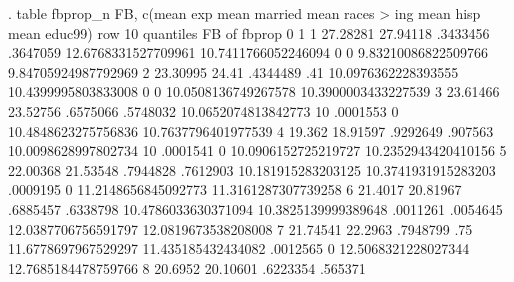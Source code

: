 . table fbprop_n FB, c(mean exp mean married mean races
> ing mean hisp mean educ99) row
{\smallskip}
10        {\VBAR}
quantiles {\VBAR}                    FB                   
of fbprop {\VBAR}                   0                    1
        1 {\VBAR}            27.28281             27.94118
          {\VBAR}            .3433456             .3647059
          {\VBAR} 12.6768331527709961  10.7411766052246094
          {\VBAR}                   0                    0
          {\VBAR} 9.83210086822509766  9.84705924987792969
          {\VBAR} 
        2 {\VBAR}            23.30995                24.41
          {\VBAR}            .4344489                  .41
          {\VBAR} 10.0976362228393555  10.4399995803833008
          {\VBAR}                   0                    0
          {\VBAR} 10.0508136749267578  10.3900003433227539
          {\VBAR} 
        3 {\VBAR}            23.61466             23.52756
          {\VBAR}            .6575066             .5748032
          {\VBAR} 10.0652074813842773                   10
          {\VBAR}            .0001553                    0
          {\VBAR} 10.4848623275756836  10.7637796401977539
          {\VBAR} 
        4 {\VBAR}              19.362             18.91597
          {\VBAR}            .9292649              .907563
          {\VBAR} 10.0098628997802734                   10
          {\VBAR}            .0001541                    0
          {\VBAR} 10.0906152725219727  10.2352943420410156
          {\VBAR} 
        5 {\VBAR}            22.00368             21.53548
          {\VBAR}            .7944828             .7612903
          {\VBAR}  10.181915283203125  10.3741931915283203
          {\VBAR}            .0009195                    0
          {\VBAR} 11.2148656845092773  11.3161287307739258
          {\VBAR} 
        6 {\VBAR}             21.4017             20.81967
          {\VBAR}            .6885457             .6338798
          {\VBAR} 10.4786033630371094  10.3825139999389648
          {\VBAR}            .0011261             .0054645
          {\VBAR} 12.0387706756591797  12.0819673538208008
          {\VBAR} 
        7 {\VBAR}            21.74541              22.2963
          {\VBAR}            .7948799                  .75
          {\VBAR} 11.6778697967529297   11.435185432434082
          {\VBAR}            .0012565                    0
          {\VBAR} 12.5068321228027344  12.7685184478759766
          {\VBAR} 
        8 {\VBAR}             20.6952             20.10601
          {\VBAR}            .6223354              .565371
